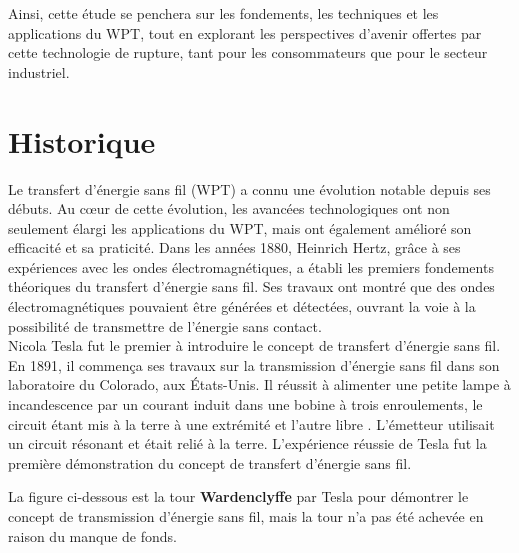 \documentclass[12pt,a4paper,titlepage,notitlepage]{article}
\begin{document}
	
	Ainsi, cette étude se penchera sur les fondements, les techniques et les applications du WPT, tout en explorant les perspectives d'avenir offertes par cette technologie de rupture, tant pour les consommateurs que pour le secteur industriel.
	
	
	\newpage
	\section{Historique}
	\vspace{1cm}
	Le transfert d'énergie sans fil (WPT) a connu une évolution notable depuis ses débuts. Au cœur de cette évolution, les avancées technologiques ont non seulement élargi les applications du WPT, mais ont également amélioré son efficacité et sa praticité. Dans les années 1880, Heinrich Hertz, grâce à ses expériences avec les ondes électromagnétiques, a établi les premiers fondements théoriques du transfert d'énergie sans fil. Ses travaux ont montré que des ondes électromagnétiques pouvaient être générées et détectées, ouvrant la voie à la possibilité de transmettre de l'énergie sans contact.\\
	
	Nicola Tesla fut le premier à introduire le concept de transfert d'énergie
	sans fil. En 1891, il commença ses travaux sur la transmission d'énergie
	sans fil dans son laboratoire du Colorado, aux États-Unis. Il réussit à
	alimenter une petite lampe à incandescence par un courant induit dans une
	bobine à trois enroulements, le circuit étant mis à la terre à une extrémité et
	l'autre libre . L'émetteur utilisait un circuit résonant et était relié à la terre.
	L'expérience réussie de Tesla fut la première démonstration du concept de
	transfert d'énergie sans fil.
	
	La figure ci-dessous est la tour \textbf{Wardenclyffe} par Tesla pour démontrer le concept de transmission d'énergie sans fil, mais la tour n'a pas été achevée en raison du manque de fonds.
	
\end{document}
